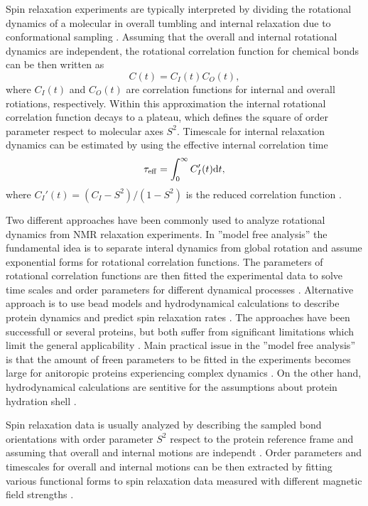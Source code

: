 \documentclass[pre,aps,floatfix,authordate1-4,twocolumn]{revtex4-1}
\begin{document}
Spin relaxation experiments are typically interpreted by
dividing the rotational dynamics of a molecular in overall tumbling 
and internal relaxation due to conformational sampling \cite{wennerstrom79,Lipari82,jarymowycz06,korzhnev01}.
Assuming that the overall and internal rotational dynamics are independent,
the rotational correlation function for chemical bonds can be then written as \cite{??}
\begin{equation}\label{CORRFsep}
  C(t)=C_I(t)C_O(t),
\end{equation}
where $C_I(t)$ and $C_O(t)$ are correlation functions for internal and overall
rotiations, respectively. Within this approximation 
the internal rotational correlation function decays to a plateau, which
defines the square of order parameter respect to molecular axes $S^2$.
Timescale for internal relaxation dynamics can be estimated by using the
effective internal correlation time 
\begin{equation}
  \tau_{\rm eff}=\int_0^\infty C_I'(t) \mathrm{d}t,
\end{equation}
where $C_I'(t)=(C_I-S^2)/(1-S^2)$ is the reduced correlation function \cite{??}.

Two different approaches have been commonly used to analyze
rotational dynamics from NMR relaxation experiments. In
''model free analysis'' the fundamental idea is to separate
interal dynamics from global rotation and assume exponential
forms for rotational correlation functions. The parameters of
rotational correlation functions are then fitted the experimental
data to solve time scales and order parameters for different dynamical
processes \cite{dosset00,??}. Alternative approach is to use bead models and hydrodynamical
calculations to describe protein dynamics and predict spin relaxation rates \cite{torre00}.
The approaches have been successfull or several proteins, but both suffer
from significant limitations which limit the general applicability \cite{??}.
Main practical issue in the ''model free analysis'' is that the amount of
freen parameters to be fitted in the experiments becomes large for anitoropic
proteins experiencing complex dynamics \cite{??}. On the other hand,
hydrodynamical calculations are sentitive for the assumptions about
protein hydration shell \cite{torre00}.


Spin relaxation data is usually analyzed by describing the sampled bond
orientations with order parameter $S^2$ respect to the protein reference frame
and assuming that overall and internal motions are independt \cite{??,korzhnev01}.
Order parameters and timescales for overall and internal motions can be then
extracted by fitting various functional forms to spin relaxation data
measured with different magnetic field strengths \cite{jarymowycz06,korzhnev01}.
\end{document}

